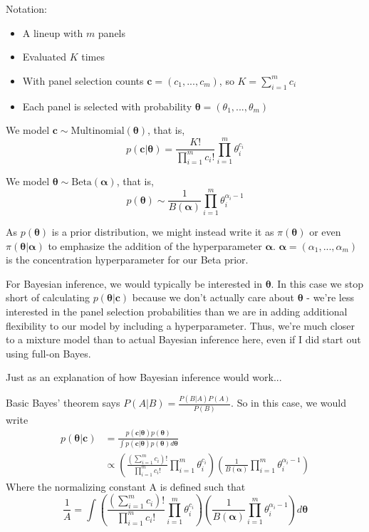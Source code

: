 \documentclass{article}
\begin{document}
Notation:
\begin{itemize}
\item A lineup with $m$ panels
\item Evaluated $K$ times
\item With panel selection counts $\bm c = (c_1, ..., c_m)$, so $K = \sum_{i=1}^m c_i$
\item Each panel is selected with probability $\bm\theta = (\theta_1, ..., \theta_m)$
\end{itemize}

We model $\bm c \sim \text{Multinomial}(\bm\theta)$, that is, 
$$p(\bm c | \bm \theta) = \frac{K!}{\prod_{i=1}^m c_i!} \prod_{i=1}^m \theta_i^{c_i}$$

We model $\bm \theta  \sim \text{Beta}(\bm \alpha)$, that is, 
$$p(\bm \theta) \sim \frac{1}{B(\bm \alpha)} \prod_{i=1}^m\theta_i^{\alpha_i - 1}$$

As $p(\bm\theta)$ is a prior distribution, we might instead write it as $\pi(\bm\theta)$ or even $\pi(\bm\theta|\bm\alpha)$ to emphasize the addition of the hyperparameter $\bm\alpha$. $\bm\alpha = (\alpha_1, ..., \alpha_m)$ is the concentration hyperparameter for our Beta prior. 

For Bayesian inference, we would typically be interested in $\bm\theta$. In this case we stop short of calculating $p(\bm\theta|\bm c)$ because we don't actually care about $\bm\theta$ - we're less interested in the panel selection probabilities than we are in adding additional flexibility to our model by including a hyperparameter. Thus, we're much closer to a mixture model than to actual Bayesian inference here, even if I did start out using full-on Bayes. 

Just as an explanation of how Bayesian inference would work...

Basic Bayes' theorem says $P(A|B) = \displaystyle\frac{P(B|A)P(A)}{P(B)}$. So in this case, we would write 
\begin{align*}
p(\bm\theta | \bm c) &= \frac{p(\bm c|\bm\theta)p(\bm \theta)}{\int p(\bm c|\bm \theta)p(\bm\theta) d\bm\theta}\\
&\propto \left(\frac{\left(\sum_{i=1}^m c_i\right)!}{\prod_{i=1}^m c_i!}\prod_{i=1}^m\theta_i^{c_i}\right)\left(\frac{1}{B(\bm\alpha)}\prod_{i=1}^m\theta_i^{\alpha_i - 1}\right)
\end{align*}
Where the normalizing constant A is defined such that $$\frac{1}{A} = \displaystyle\int\left(\frac{\left(\sum_{i=1}^m c_i\right)!}{\prod_{i=1}^m c_i!}\prod_{i=1}^m\theta_i^{c_i}\right)\left(\frac{1}{B(\bm\alpha)}\prod_{i=1}^m\theta_i^{\alpha_i - 1}\right)d\bm\theta $$
\end{document}

